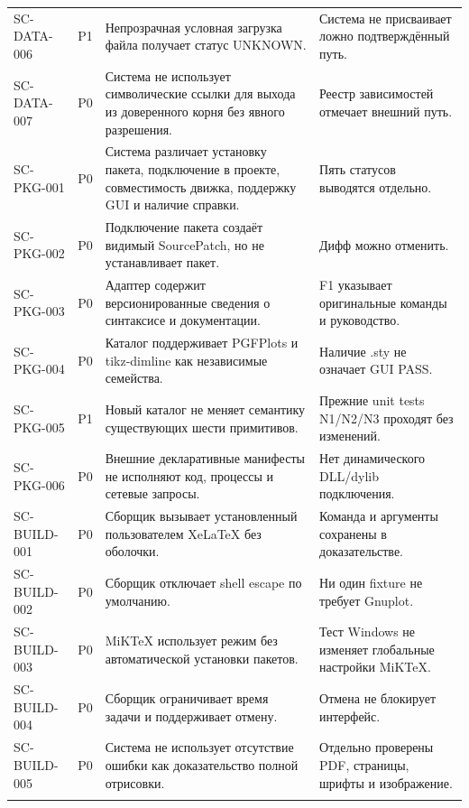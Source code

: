 \documentclass[11pt,a4paper,oneside]{scrreprt}
\begin{document}
\begin{longtable}{@{}>{\raggedright\arraybackslash}p{2.35cm}>{\raggedright\arraybackslash}p{0.75cm}>{\raggedright\arraybackslash}p{6.35cm}>{\raggedright\arraybackslash}p{5.2cm}@{}}
\footnotesize SC-DATA-006 & P1 & Непрозрачная условная загрузка файла получает статус UNKNOWN. & Система не присваивает ложно подтверждённый путь. \\ \addlinespace[2pt]
\footnotesize SC-DATA-007 & P0 & Система не использует символические ссылки для выхода из доверенного корня без явного разрешения. & Реестр зависимостей отмечает внешний путь. \\ \addlinespace[2pt]
\footnotesize SC-PKG-001 & P0 & Система различает установку пакета, подключение в проекте, совместимость движка, поддержку GUI и наличие справки. & Пять статусов выводятся отдельно. \\ \addlinespace[2pt]
\footnotesize SC-PKG-002 & P0 & Подключение пакета создаёт видимый SourcePatch, но не устанавливает пакет. & Дифф можно отменить. \\ \addlinespace[2pt]
\footnotesize SC-PKG-003 & P0 & Адаптер содержит версионированные сведения о синтаксисе и документации. & F1 указывает оригинальные команды и руководство. \\ \addlinespace[2pt]
\footnotesize SC-PKG-004 & P0 & Каталог поддерживает PGFPlots и tikz-dimline как независимые семейства. & Наличие .sty не означает GUI PASS. \\ \addlinespace[2pt]
\footnotesize SC-PKG-005 & P1 & Новый каталог не меняет семантику существующих шести примитивов. & Прежние unit tests N1/N2/N3 проходят без изменений. \\ \addlinespace[2pt]
\footnotesize SC-PKG-006 & P0 & Внешние декларативные манифесты не исполняют код, процессы и сетевые запросы. & Нет динамического DLL/dylib подключения. \\ \addlinespace[2pt]
\footnotesize SC-BUILD-001 & P0 & Сборщик вызывает установленный пользователем XeLaTeX без оболочки. & Команда и аргументы сохранены в доказательстве. \\ \addlinespace[2pt]
\footnotesize SC-BUILD-002 & P0 & Сборщик отключает shell escape по умолчанию. & Ни один fixture не требует Gnuplot. \\ \addlinespace[2pt]
\footnotesize SC-BUILD-003 & P0 & MiKTeX использует режим без автоматической установки пакетов. & Тест Windows не изменяет глобальные настройки MiKTeX. \\ \addlinespace[2pt]
\footnotesize SC-BUILD-004 & P0 & Сборщик ограничивает время задачи и поддерживает отмену. & Отмена не блокирует интерфейс. \\ \addlinespace[2pt]
\footnotesize SC-BUILD-005 & P0 & Система не использует отсутствие ошибки как доказательство полной отрисовки. & Отдельно проверены PDF, страницы, шрифты и изображение. \\ \addlinespace[2pt]

\end{longtable}
\end{document}
